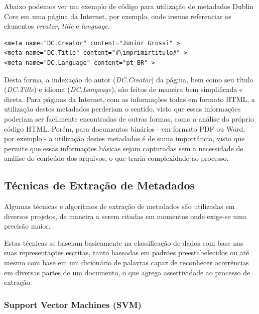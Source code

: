 \begin{textonovo}
Abaixo podemos ver um exemplo de código para utilização de metadados Dublin Core em uma página da Internet, por exemplo, onde iremos referenciar os elementos \textit{creator}, \textit{title} e \textit{language}.

\lstset{language=HTML}
\begin{lstlisting}[escapechar=\#]
<meta name="DC.Creator" content="Junior Grossi" >
<meta name="DC.Title" content="#\imprimirtitulo#" >
<meta name="DC.Language" content="pt_BR" >
\end{lstlisting}

Desta forma, a indexação do autor (\textit{DC.Creator}) da página, bem como seu título (\textit{DC.Title}) e idioma (\textit{DC.Language}), são feitos de maneira bem simplificada e direta. Para páginas da Internet, com as informações todas em formato HTML, a utilização destes metadados perderiam o sentido, visto que essas informações poderiam ser facilmente encontradas de outras formas, como a análise do próprio código HTML. Porém, para documentos binários - em formato PDF ou Word, por exemplo - a utilização destes metadados é de suma importância, visto que permite que essas informações básicas sejam capturadas sem a necessidade de análise do conteúdo dos arquivos, o que traria complexidade ao processo.

\end{textonovo}

\subsection{Técnicas de Extração de Metadados}


Algumas técnicas e algoritmos de extração de metadados são utilizadas em diversos projetos, de maneira a serem citadas em momentos onde exige-se uma precisão maior.

Estas técnicas se baseiam basicamente na classificação de dados com base nas suas representações escritas, tanto baseadas em padrões preestabelecidos ou até mesmo com base em um dicionário de palavras capaz de reconhecer ocorrências em diversas partes de um documento, o que agrega assertividade ao processo de extração.

\subsubsection{Support Vector Machines (SVM)}
\label{tecnica-svm}

